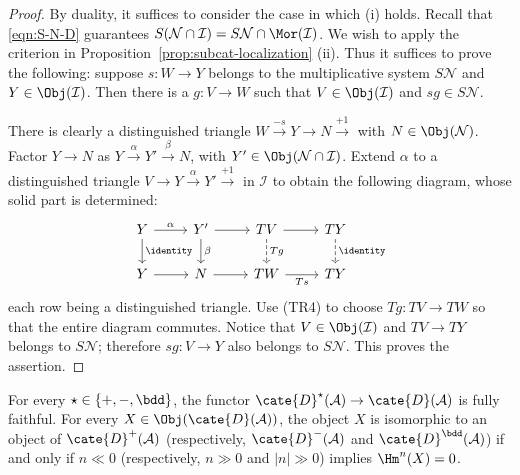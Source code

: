 \begin{proof}
	By duality, it suffices to consider the case in which (i) holds. Recall
	that \eqref{eqn:S-N-D} guarantees
	$S(\mathcal{N} \cap \mathcal{I}) =
	S\mathcal{N} \cap \Mor(\mathcal{I})$. We wish to apply the criterion in
	Proposition~\ref{prop:subcat-localization} (ii). Thus it suffices to prove
	the following: suppose $s: W \to Y$ belongs to the multiplicative system
	$S\mathcal{N}$ and $Y \in \Obj(\mathcal{I})$. Then there is a
	$g: V \to W$ such that $V \in \Obj(\mathcal{I})$ and
	$sg \in S\mathcal{N}$.

	There is clearly a distinguished triangle
	$W \xrightarrow{-s} Y \to N \xrightarrow{+1}$ with
	$N \in \Obj(\mathcal{N})$. Factor $Y \to N$ as
	$Y \xrightarrow{\alpha} Y' \xrightarrow{\beta} N$, with
	$Y' \in \Obj(\mathcal{N} \cap \mathcal{I})$. Extend $\alpha$ to a
	distinguished triangle $V \to Y \xrightarrow{\alpha} Y'
	\xrightarrow{+1}$ in $\mathcal{I}$ to obtain the following diagram, whose
	solid part is determined:
	\[\begin{tikzcd}
		Y \arrow[r, "\alpha"] \arrow[d, "\identity"] & Y' \arrow[d, "\beta"] \arrow[r] & TV \arrow[r] \arrow[dashed, d, "Tg"] & TY \arrow[d, dashed, "\identity"] \\
		Y \arrow[r] & N \arrow[r] & TW \arrow[r, "Ts"'] & TY 
	\end{tikzcd}\]
	each row being a distinguished triangle. Use (TR4) to choose
	$Tg: TV \to TW$ so that the entire diagram commutes. Notice that
	$V \in \Obj(\mathcal{I})$ and $TV \to TY$ belongs to $S\mathcal{N}$;
	therefore $sg: V \to Y$ also belongs to $S\mathcal{N}$. This proves the
	assertion.
\end{proof}

\begin{proposition}\label{prop:derived-full-faithful-subcat}
	For every $\star \in \{+, -, \bdd\}$, the functor
	$\cate{D}^{\star}(\mathcal{A}) \to \cate{D}(\mathcal{A})$ is fully
	faithful. For every $X \in \Obj(\cate{D}(\mathcal{A}))$, the object $X$
	is isomorphic to an object of $\cate{D}^{+}(\mathcal{A})$ (respectively,
	$\cate{D}^{-}(\mathcal{A})$ and $\cate{D}^{\bdd}(\mathcal{A})$) if and
	only if $n \ll 0$ (respectively, $n \gg 0$ and $|n| \gg 0$) implies
	$\Hm^n(X) = 0$.
\end{proposition}

